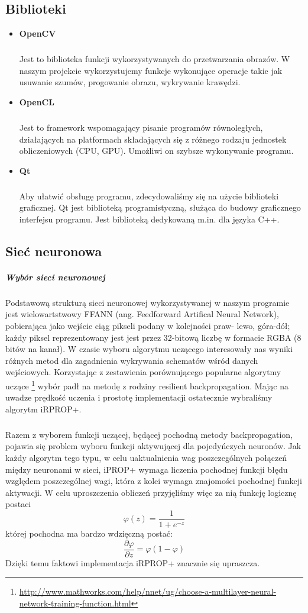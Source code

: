 \documentclass{article}
\begin{document}
\subsection{Biblioteki}
\begin{itemize}
\item \textbf{OpenCV}
\subparagraph{} Jest to biblioteka funkcji wykorzystywanych do przetwarzania obrazów. W naszym projekcie wykorzystujemy funkcje wykonujące operacje takie jak usuwanie szumów, progowanie obrazu, wykrywanie krawędzi.

\item \textbf{OpenCL}
\subparagraph{} Jest to framework wspomagający pisanie programów równoległych, działających na platformach składających się z różnego rodzaju jednostek obliczeniowych (CPU, GPU). Umożliwi on szybsze wykonywanie programu.

\item \textbf{Qt}
\subparagraph{} Aby ułatwić obsługę programu, zdecydowaliśmy się na użycie biblioteki graficznej.  Qt jest biblioteką programistyczną, służąca do budowy graficznego interfejsu programu. Jest biblioteką dedykowaną m.in. dla języka C++. 

\end{itemize}

\subsection{Sieć neuronowa}
\subparagraph{Wybór sieci neuronowej} Podstawową strukturą sieci neuronowej wykorzystywanej w naszym programie jest wielowartstwowy FFANN (ang. Feedforward Artifical Neural Network), pobierająca jako wejście ciąg pikseli podany w kolejności praw- lewo, góra-dół; każdy piksel reprezentowany jest jest przez 32-bitową liczbę w formacie RGBA (8 bitów na kanał).
W czasie wyboru algorytmu uczącego interesowały nas wyniki różnych metod dla zagadnienia wykrywania schematów wśród danych wejściowych. Korzystając z zestawienia porównującego popularne algorytmy uczące \footnote{\scriptsize \url{http://www.mathworks.com/help/nnet/ug/choose-a-multilayer-neural-network-training-function.html}} wybór padł na metodę z rodziny resilient backpropagation. Mając na uwadze prędkość uczenia i prostotę implementacji ostatecznie wybraliśmy algorytm iRPROP+.

\subparagraph{} Razem z wyborem funkcji uczącej, będącej pochodną metody backpropagation, pojawia się problem wyboru funkcji aktywującej dla pojedyńczych neuronów. Jak każdy algorytm tego typu, w celu uaktualnienia wag poszczególnych połączeń między neuronami w sieci, iPROP+ wymaga liczenia pochodnej funkcji błędu względem poszczególnej wagi, która z kolei wymaga znajomości pochodnej funkcji aktywacji. W celu uproszczenia obliczeń przyjęliśmy więc za nią funkcję logicznę postaci \[ \varphi (z) = \frac{1}{1+e^{-z}} \] której pochodna ma bardzo wdzięczną postać: \[ \frac{\partial\varphi}{\partial z} = \varphi (1 - \varphi) \] Dzięki temu faktowi implementacja iRPROP+ znacznie się upraszcza. 
\end{document}
